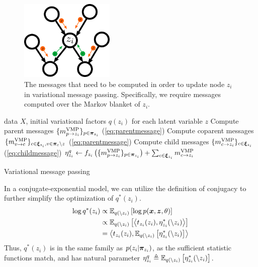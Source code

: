 \begin{figure}[htp!]
    \centering
    \includegraphics[width=0.4\textwidth]{img/nvmp/vmp-4}
    \caption{The messages that need to be computed in order to update
    node $z_i$ in variational message passing. Specifically, we require
    messages computed over the Markov blanket of $z_i$.}
    \label{fig:vmp}
\end{figure}
\begin{algorithm}[htp!]
\begin{algorithmic}
    data $X$, initial variational factors $q(z_i)$ for each latent variable $z$
   \REPEAT
   \STATE Compute parent messages $\{m^{\text{VMP}}_{p \rightarrow z_i}\}_{p \in \bm{\pi}_{z_i}}$ (\autoref{eq:parentmessage})
   \STATE Compute coparent messages $\{m^{\text{VMP}}_{v \rightarrow c}\}_{c \in \bm{\xi}_{z_i}, v \in \bm{\pi}_c \backslash z}$ (\autoref{eq:parentmessage})
   \STATE Compute child messages $\{m^{\text{VMP}}_{c \rightarrow z_i}\}_{c \in \bm{\xi}_{z_i}}$
   (\autoref{eq:childmessage})
   \STATE $\eta^q_{z_i} \leftarrow f_{z_i}\left(\{m^{\text{VMP}}_{p \rightarrow z_i}\}_{p \in \bm{\pi}_{z_i}}\right) + \sum_{c \in \bm{\xi}_{z_i}} m^{\text{VMP}}_{c \rightarrow z_i}$ 
   \ENDFOR
\end{algorithmic}
   \caption{Variational message passing}
   \label{alg:vmp}
\end{algorithm}


In a conjugate-exponential model, we can utilize the definition
of conjugacy to further simplify the optimization of $q^*(z_i)$.
\begin{equation}
\begin{split}
    \log q^*(z_i) &\propto \mathbb{E}_{q(\backslash z_i)} \left[
    \log p(\bm{x}, \bm{z}, \theta)\right]\\
    &\propto \mathbb{E}_{q(\backslash z_i)} \left[
    \left\langle t_{z_i}(z_i), \eta^*_{z_i}(\backslash z_i)\right\rangle\right]\\
    &= 
    \left\langle t_{z_i}(z_i), \mathbb{E}_{q(\backslash z_i)}\left[\eta^*_{z_i}(\backslash z_i)\right]\right\rangle
\end{split}
\end{equation}
Thus, $q^*(z_i)$ 
is in the same family as $p(z_i | \bm{\pi}_{z_i})$,
as the sufficient statistic functions match,
and has natural parameter $\eta^q_{z_i} \triangleq \mathbb{E}_{q(\backslash z_i)}\left[\eta^*_{z_i}(\backslash z_i)\right]$.

